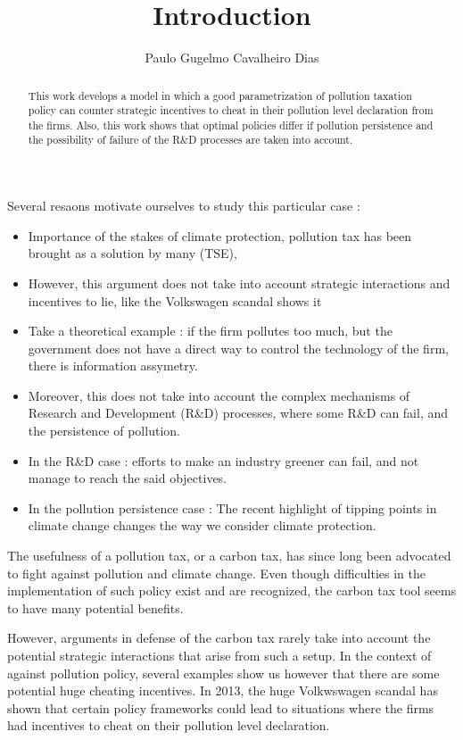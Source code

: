 \documentclass{article}
\title{Introduction}
\author{Paulo Gugelmo Cavalheiro Dias}
\begin{document}
\maketitle

\begin{abstract}
    This work develops a model in which a good parametrization of pollution taxation policy can counter strategic incentives to cheat in their pollution level declaration from the firms. Also, this work shows that optimal policies differ if pollution persistence and the possibility of failure of the R\&D processes are taken into account. 
\end{abstract}

Several resaons motivate ourselves to study this particular case : 
\begin{itemize}
    \item Importance of the stakes of climate protection, pollution tax has been brought as a solution by many (TSE),
    \item However, this argument does not take into account strategic interactions and incentives to lie, like the Volkswagen scandal shows it
    \item Take a theoretical example : if the firm pollutes too much, but the government does not have a direct way to control the technology of the firm, there is information assymetry. 
    \item Moreover, this does not take into account the complex mechanisms of Research and Development (R\&D) processes, where some R\&D can fail, and the persistence of pollution. 
    \item In the R\&D case : efforts to make an industry greener can fail, and not manage to reach the said objectives. 
    \item In the pollution persistence case : The recent highlight of tipping points in climate change changes the way we consider climate protection.
\end{itemize}
\pagebreak
The usefulness of a pollution tax, or a carbon tax, has since long been advocated to fight against pollution and climate change. Even though difficulties in the implementation of such policy exist and are recognized, the carbon tax tool seems to have many potential benefits.

However, arguments in defense of the carbon tax rarely take into account the potential strategic interactions that arise from such a setup. In the context of against pollution policy, several examples show us however that there are some potential huge cheating incentives. In 2013, the huge Volkwswagen scandal has shown that certain policy frameworks could lead to situations where the firms had incentives to cheat on their pollution level declaration. 
\end{document}
